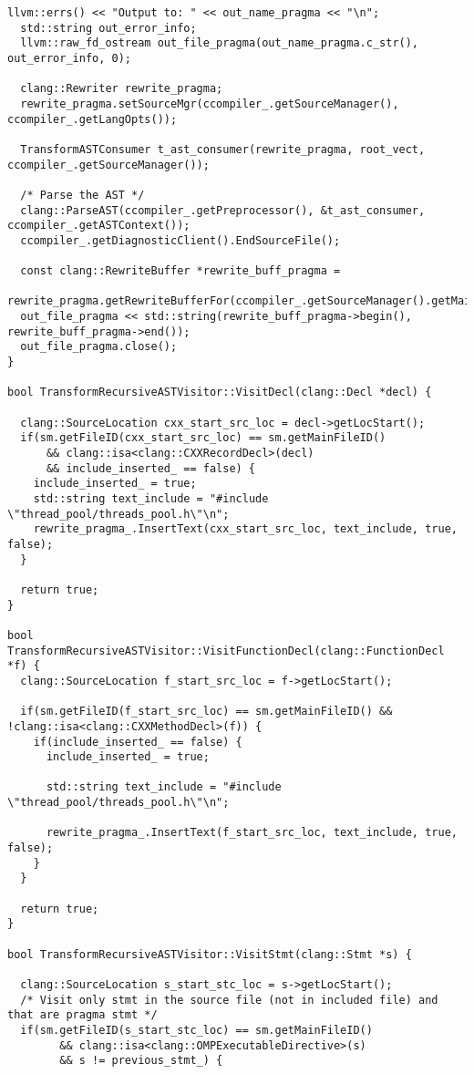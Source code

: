 \documentclass[a4paper,10pt,twoside]{book}
\begin{document}
\begin{lstlisting}[language=CCC, caption=driver/program.cpp]
  llvm::errs() << "Output to: " << out_name_pragma << "\n";
  std::string out_error_info;
  llvm::raw_fd_ostream out_file_pragma(out_name_pragma.c_str(), out_error_info, 0);  

  clang::Rewriter rewrite_pragma;
  rewrite_pragma.setSourceMgr(ccompiler_.getSourceManager(), ccompiler_.getLangOpts());

  TransformASTConsumer t_ast_consumer(rewrite_pragma, root_vect, ccompiler_.getSourceManager());
  
  /* Parse the AST */
  clang::ParseAST(ccompiler_.getPreprocessor(), &t_ast_consumer, ccompiler_.getASTContext());
  ccompiler_.getDiagnosticClient().EndSourceFile();

  const clang::RewriteBuffer *rewrite_buff_pragma = 
      rewrite_pragma.getRewriteBufferFor(ccompiler_.getSourceManager().getMainFileID());
  out_file_pragma << std::string(rewrite_buff_pragma->begin(), rewrite_buff_pragma->end());
  out_file_pragma.close();
}

bool TransformRecursiveASTVisitor::VisitDecl(clang::Decl *decl) {

  clang::SourceLocation cxx_start_src_loc = decl->getLocStart();
  if(sm.getFileID(cxx_start_src_loc) == sm.getMainFileID() 
      && clang::isa<clang::CXXRecordDecl>(decl)
      && include_inserted_ == false) {
    include_inserted_ = true;
    std::string text_include = "#include \"thread_pool/threads_pool.h\"\n";
    rewrite_pragma_.InsertText(cxx_start_src_loc, text_include, true, false);
  }

  return true;
}

bool TransformRecursiveASTVisitor::VisitFunctionDecl(clang::FunctionDecl *f) {     
  clang::SourceLocation f_start_src_loc = f->getLocStart();

  if(sm.getFileID(f_start_src_loc) == sm.getMainFileID() && !clang::isa<clang::CXXMethodDecl>(f)) {
    if(include_inserted_ == false) {
      include_inserted_ = true;

      std::string text_include = "#include \"thread_pool/threads_pool.h\"\n";

      rewrite_pragma_.InsertText(f_start_src_loc, text_include, true, false);
    }
  }

  return true;
}

bool TransformRecursiveASTVisitor::VisitStmt(clang::Stmt *s) {
  
  clang::SourceLocation s_start_stc_loc = s->getLocStart();
  /* Visit only stmt in the source file (not in included file) and that are pragma stmt */
  if(sm.getFileID(s_start_stc_loc) == sm.getMainFileID() 
        && clang::isa<clang::OMPExecutableDirective>(s) 
        && s != previous_stmt_) {
    

\end{lstlisting}
\end{document}
